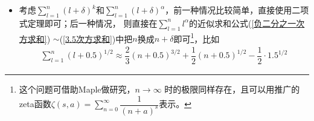 \begin{itemize}[leftmargin=\inteval{\myitemleftmargin}pt,itemsep=
   \inteval{\myitemitempsep}pt,topsep=\inteval{\myitemtopsep}pt]
\item 考虑$ \sum\limits_{l=1}^{n} (l+\delta)^k $和$ \sum\limits_{l=1}^{n}
(l+\delta)^{\alpha} $，前一种情况比较简单，直接使用二项式定理即可；后一种情况，
则直接在$ \sum\limits_{l=1}^{n} l^{\alpha} $的近似求和公式(\ref{负二分之一次方求和})
$ \sim $(\ref{3.5次方求和})中把$ n $换成$ n+\delta $即可\footnote{
 这个问题可借助Maple做研究，$ n\to \infty $
 时的极限同样存在，且可以用推广的zeta函数$ \zeta(s,a) =\sum\limits_{n=0}^{\infty}\dfrac{1}{(n+a)^s} $表示。}，比如
\begin{gather*}
    \sum\limits_{l=1}^{n} (l+0.5)^{1/2}\approx \dfrac{2}{3}(n+0.5)^{3/2}
    +\dfrac{1}{2}(n+0.5)^{1/2}-\dfrac{1}{2}\cdot 1.5^{1/2}
\end{gather*}

\end{itemize}


